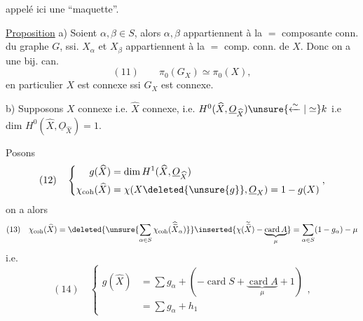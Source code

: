 appelé ici une ``maquette''.

\uline{Proposition} 
a) Soient $\alpha,\beta\in S$, alors $\alpha,\beta$ appartiennent à la $=$ composante conn. du graphe $G$, ssi. $X_\alpha$ et $X_\beta$ appartiennent à la $=$ comp. conn. de $X$. Donc  on a une bij. can.
\[
(11)\qquad\pi_0(G_X)\simeq\pi_0(X),
\]
en particulier $X$ est connexe ssi $G_X$ est connexe.

b) Supposons $X$ connexe i.e. $\widehat X$ connexe, i.e. $H^0(\widehat X,\underline O_{\widehat X})\unsure{\xleftarrow{\sim}|\simeq}k$ i.e dim $H^0(\widehat X,\underline O_{\widehat X})=1$.

Posons 
\[
(12)\quad\left\{\begin{aligned}
g(\widehat X)&=\dim H^1(\widehat X,\underline O_{\widehat X})\\
\chi_{\mathrm{coh}}(\widehat X)&=\chi(X\deleted{\unsure{g}},\underline O_X)=1-g(X)
\end{aligned}\right.,
\]
on a alors
\[
(13)\quad\chi_{\mathrm{coh}}(\widehat X)
=\deleted{\unsure{\sum_{\alpha\in S}\chi_{\mathrm{coh}}(\widehat{\widetilde X}_\alpha)}}
\inserted{\chi(\widetilde{\widehat X})-\underbrace{\operatorname{card}A}_{\mu}}
=\sum_{\alpha\in S}(1-g_\alpha)-\mu
\]
i.e.
\[
(14)\quad\left\{\begin{aligned}
g(\widehat X)&=\sum g_\alpha+(-\operatorname{card}S+\underbrace{\operatorname{card}A}_{\mu}+1)\\
&=\sum g_\alpha+h_1
\end{aligned}\right.,
\]
